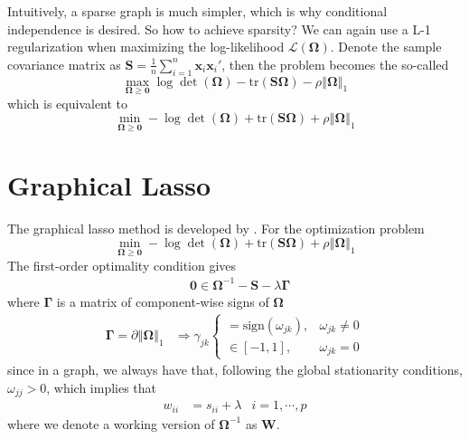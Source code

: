 \documentclass[twoside]{article}
\begin{document}
Intuitively, a sparse graph is much simpler, which is why conditional independence is desired. So how to achieve sparsity? We can again use a L-1 regularization when maximizing the log-likelihood $\mathcal{L}(\boldsymbol{\Omega})$. Denote the sample covariance matrix as $\mathbf{S} = \frac{1}{n}\sum^n_{i=1}\mathbf{x}_i\mathbf{x}_i'$, then the problem becomes the so-called 
$$
\max_{\boldsymbol{\Omega}\geq \mathbf{0}}\log \det (\boldsymbol{\Omega}) - \mathrm{tr}(\mathbf{S}\boldsymbol{\Omega}) - \rho\left\Vert \boldsymbol{\Omega} \right\Vert _1
$$
which is equivalent to 
$$
\min_{\boldsymbol{\Omega}\geq \mathbf{0}} -\log \det (\boldsymbol{\Omega}) + \mathrm{tr}(\mathbf{S}\boldsymbol{\Omega}) +\rho\left\Vert \boldsymbol{\Omega} \right\Vert _1
$$

\section{Graphical Lasso}
The graphical lasso method is developed by \citep{friedman2008sparse}. For the optimization problem 
\begin{equation}
    \min_{\boldsymbol{\Omega}\geq \mathbf{0}} -\log \det (\boldsymbol{\Omega}) + \mathrm{tr}(\mathbf{S}\boldsymbol{\Omega}) +\rho\left\Vert \boldsymbol{\Omega} \right\Vert _1 
\end{equation}
The first-order optimality condition gives
\begin{align*}
    &\mathbf{0} \in \boldsymbol{\Omega}^{-1} - \mathbf{S} -\lambda \boldsymbol{\Gamma}
\end{align*}
where $\boldsymbol{\Gamma}$ is a matrix of component-wise signs of $\boldsymbol{\Omega}$
\begin{align*}
    \boldsymbol{\Gamma} = \partial \left\Vert \boldsymbol{\Omega} \right\Vert _1 & \Rightarrow \gamma_{jk} \begin{cases}
        = \text{sign}(\omega_{jk}), &\omega_{jk}\neq 0\\
        \in  [-1,1], &\omega_{jk}=0
    \end{cases}
\end{align*}
since in a graph, we always have that, following the global stationarity conditions, $\omega_{jj}>0$, which implies that 
\begin{align}\label{eq:ghlasso_stationarity_condition}
    w_{ii} &= s_{ii} + \lambda & i=1,\cdots,p
\end{align}
where we denote a working version of $\boldsymbol{\Omega}^{-1}$ as $\mathbf{W}$.
\end{document}
